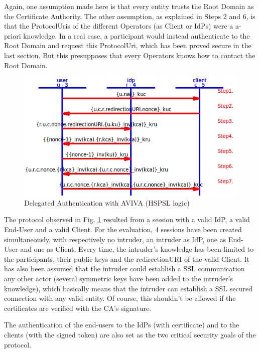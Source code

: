 Again, one assumption made here is that every entity trusts the Root Domain as the Certificate Authority. The other assumption, as explained in Steps 2 and 6, is that the ProtocolUris of the different Operators (as Client or IdPs) were a a-priori knowledge. In a real case, a participant would instead authenticate to the Root Domain and request this ProtocolUri, which has been proved secure in the last section. But this presupposes that every Operators knows how to contact the Root Domain. 

\begin{figure}[!htbp]
	\centering
	\caption{Delegated Authentication with AVIVA (HSPSL logic)}
	\label{fig:AVIVA_delegated_auth}
	\includegraphics[width=1\textwidth]{images/prot_eva.png}
\end{figure}

The protocol observed in Fig. \ref{fig:AVIVA_delegated_auth} resulted from a session with a valid IdP, a valid End-User and a valid Client. For the evaluation, 4 sessions have been created simultaneously, with respectively no intruder, an intruder as IdP, one as End-User and one as Client. Every time, the intruder's knowledge has been limited to the participants, their public keys and the redirectionURI of the valid Client. It has also been assumed that the intruder could establish a SSL communication any other actor (several symmetric keys have been added to the intruder's knowledge), which basically means that the intruder can establish a SSL secured connection with any valid entity. Of course, this shouldn't be allowed if the certificates are verified with the CA's signature.

The authentication of the end-users to the IdPs (with certificate) and to the clients (with the signed token) are also set as the two critical security goals of the protocol.

